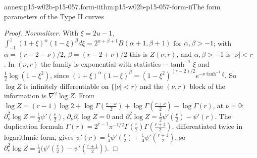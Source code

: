 \begin{annexitem}{annex:p15-w02b-p15-057.form-ii}{thm:p15-w02b-p15-057-form-ii}{The form parameters of the Type II curves}
\begin{proof}
\emph{Normalizer.} With \(\xi=2u-1\),
\(\int_{-1}^1(1+\xi)^{\alpha}(1-\xi)^{\beta}d\xi
=2^{\alpha+\beta+1}B(\alpha+1,\beta+1)\) for \(\alpha,\beta>-1\); with
\(\alpha=(r-2-\nu)/2\), \(\beta=(r-2+\nu)/2\) this is \(Z(\nu,r)\), and
\(\alpha,\beta>-1\) is \(|\nu|<r\). In \((\nu,r)\) the family is
exponential with statistics \(-\tanh^{-1}\xi\) and
\(\frac12\log(1-\xi^2)\), since
\((1+\xi)^{\alpha}(1-\xi)^{\beta}=(1-\xi^2)^{(r-2)/2}e^{-\nu\tanh^{-1}\xi}\).
So \(\log Z\) is infinitely differentiable on \(\{|\nu|<r\}\) and the
\((\nu,r)\) block of the information is \(\nabla^2\log Z\). From
\(\log Z=(r-1)\log2+\log\Gamma(\frac{r-\nu}2)+\log\Gamma(\frac{r+\nu}2)
-\log\Gamma(r)\), at \(\nu=0\): \(\partial_\nu^2\log Z=\frac12\psi'(\frac r2)\),
\(\partial_\nu\partial_r\log Z=0\) and
\(\partial_r^2\log Z=\frac12\psi'(\frac r2)-\psi'(r)\). The duplication
formula \(\Gamma(r)=2^{r-1}\pi^{-1/2}\Gamma(\frac r2)\Gamma(\frac{r+1}2)\),
differentiated twice in logarithmic form, gives
\(\psi'(r)=\frac14\psi'(\frac r2)+\frac14\psi'(\frac{r+1}2)\), so
\(\partial_r^2\log Z=\frac14\bigl(\psi'(\frac r2)-\psi'(\frac{r+1}2)\bigr)\).


\end{proof}
\end{annexitem}
